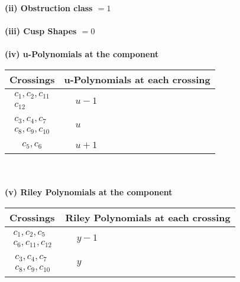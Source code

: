 \documentclass[1p]{elsarticle_modified}
\theoremstyle{definition}
\begin{document}
\flushleft \textbf{(ii) Obstruction class $= 1$}\\~\\
\flushleft \textbf{(iii) Cusp Shapes $= 0$}\\~\\
\newpage\renewcommand{\arraystretch}{1}
\flushleft \textbf{(iv) u-Polynomials at the component}\newline \\
\begin{tabular}{m{50pt}|m{274pt}}
Crossings & \hspace{64pt}u-Polynomials at each crossing \\
\hline $$\begin{aligned}c_{1},c_{2},c_{11}\\c_{12}\end{aligned}$$&$\begin{aligned}
&u-1
\end{aligned}$\\
\hline $$\begin{aligned}c_{3},c_{4},c_{7}\\c_{8},c_{9},c_{10}\end{aligned}$$&$\begin{aligned}
&u
\end{aligned}$\\
\hline $$\begin{aligned}c_{5},c_{6}\end{aligned}$$&$\begin{aligned}
&u+1
\end{aligned}$\\
\hline
\end{tabular}\\~\\
\newpage\renewcommand{\arraystretch}{1}
\flushleft \textbf{(v) Riley Polynomials at the component}\newline \\
\begin{tabular}{m{50pt}|m{274pt}}
Crossings & \hspace{64pt}Riley Polynomials at each crossing \\
\hline $$\begin{aligned}c_{1},c_{2},c_{5}\\c_{6},c_{11},c_{12}\end{aligned}$$&$\begin{aligned}
&y-1
\end{aligned}$\\
\hline $$\begin{aligned}c_{3},c_{4},c_{7}\\c_{8},c_{9},c_{10}\end{aligned}$$&$\begin{aligned}
&y
\end{aligned}$\\
\hline
\end{tabular}\\~\\
\end{document}
